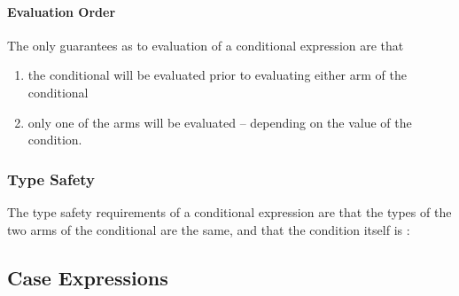 \paragraph{Evaluation Order}
The only guarantees as to evaluation of a conditional expression are that
\begin{enumerate}
\item the conditional will be evaluated prior to evaluating either arm of the conditional
\item only one of the arms will be evaluated -- depending on the value of the condition.
\end{enumerate}

\subsubsection{Type Safety}
The type safety requirements of a conditional expression are that the types of the two arms of the conditional are the same, and that the condition itself is \safeinf{}:

\begin{prooftree}
\end{prooftree}


\subsection{Case Expressions}
\label{caseExpression}

